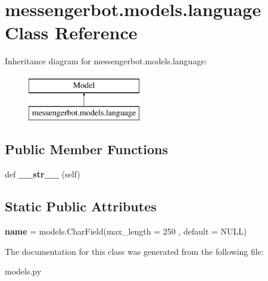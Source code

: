 \hypertarget{classmessengerbot_1_1models_1_1language}{}\section{messengerbot.\+models.\+language Class Reference}
\label{classmessengerbot_1_1models_1_1language}
Inheritance diagram for messengerbot.\+models.\+language\+:\begin{figure}[H]
\begin{center}
\leavevmode
\includegraphics[height=2.000000cm]{classmessengerbot_1_1models_1_1language}
\end{center}
\end{figure}
\subsection*{Public Member Functions}
\begin{DoxyCompactItemize}
\item 
\mbox{\label{classmessengerbot_1_1models_1_1language_a0cb14c023495e985949e8403eb4eca88}} 
def {\bfseries \+\_\+\+\_\+str\+\_\+\+\_\+} (self)
\end{DoxyCompactItemize}
\subsection*{Static Public Attributes}
\begin{DoxyCompactItemize}
\item 
\mbox{\label{classmessengerbot_1_1models_1_1language_ae12a1e259f788f923b5eb031021f507d}} 
{\bfseries name} = models.\+Char\+Field(max\+\_\+length = 250 , default = \textquotesingle{}N\+U\+LL\textquotesingle{})
\end{DoxyCompactItemize}


The documentation for this class was generated from the following file\+:\begin{DoxyCompactItemize}
\item 
models.\+py\end{DoxyCompactItemize}
